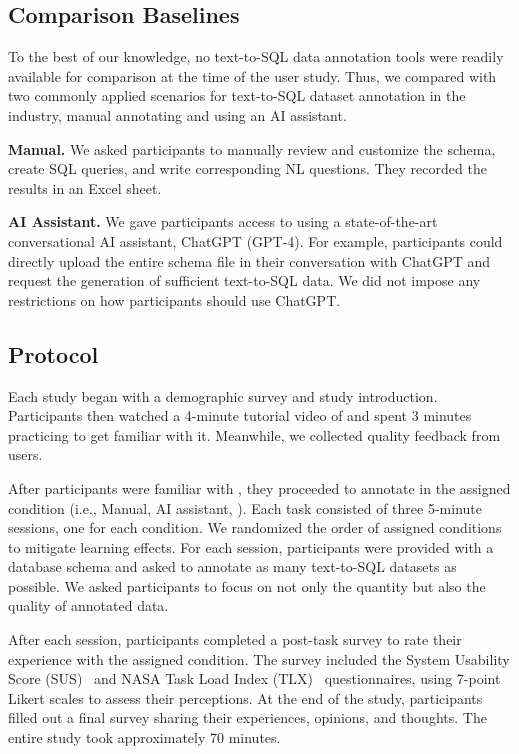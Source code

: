 \subsection{Comparison Baselines}
To the best of our knowledge, no text-to-SQL data annotation tools were readily available for comparison at the time of the user study. Thus, we compared {\tool} with two commonly applied scenarios for text-to-SQL dataset annotation in the industry, manual annotating and using an AI assistant. 

\noindent \textbf{Manual.} We asked participants to manually review and customize the schema, create SQL queries, and write corresponding NL questions. They recorded the results in an Excel sheet. 

\noindent \textbf{AI Assistant.} We gave participants access to using a state-of-the-art conversational AI assistant, ChatGPT (GPT-4). 
For example, participants could directly upload the entire schema file in their conversation with ChatGPT and request the generation of sufficient text-to-SQL data.
We did not impose any restrictions on how participants should use ChatGPT.

\subsection{Protocol}
Each study began with a demographic survey and study introduction. Participants then watched a 4-minute tutorial video of {\tool} and spent 3 minutes practicing to get familiar with it. Meanwhile, we collected quality feedback from users.

After participants were familiar with {\tool}, they proceeded to annotate in the assigned condition (i.e., Manual, AI assistant, {\tool}). Each task consisted of three 5-minute sessions, one for each condition. 
We randomized the order of assigned conditions to mitigate learning effects.
For each session, participants were provided with a database schema and asked to annotate as many text-to-SQL datasets as possible. We asked participants to focus on not only the quantity but also the quality of annotated data.

After each session, participants completed a post-task survey to rate their experience with the assigned condition. The survey included the System Usability Score (SUS)~\cite{sus} and NASA Task Load Index (TLX)~\cite{NASA-TLX} questionnaires, using 7-point Likert scales to assess their perceptions. At the end of the study, participants filled out a final survey sharing their experiences, opinions, and thoughts. The entire study took approximately 70 minutes.


